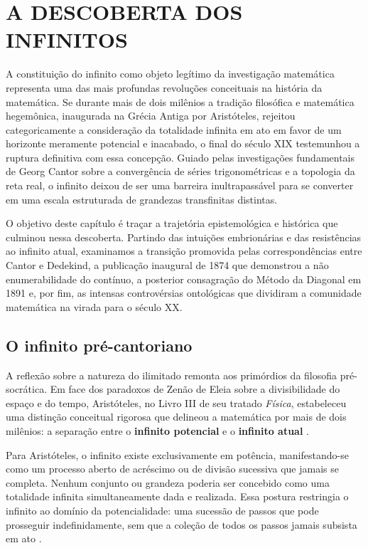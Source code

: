 
\chapter{A DESCOBERTA DOS INFINITOS}
\label{chap:infinitos}

A constituição do infinito como objeto legítimo da investigação matemática representa uma das mais profundas revoluções conceituais na história da matemática. Se durante mais de dois milênios a tradição filosófica e matemática hegemônica, inaugurada na Grécia Antiga por Aristóteles, rejeitou categoricamente a consideração da totalidade infinita em ato em favor de um horizonte meramente potencial e inacabado, o final do século XIX testemunhou a ruptura definitiva com essa concepção. Guiado pelas investigações fundamentais de Georg Cantor sobre a convergência de séries trigonométricas e a topologia da reta real, o infinito deixou de ser uma barreira inultrapassável para se converter em uma escala estruturada de grandezas transfinitas distintas.

O objetivo deste capítulo é traçar a trajetória epistemológica e histórica que culminou nessa descoberta. Partindo das intuições embrionárias e das resistências ao infinito atual, examinamos a transição promovida pelas correspondências entre Cantor e Dedekind, a publicação inaugural de 1874 que demonstrou a não enumerabilidade do contínuo, a posterior consagração do Método da Diagonal em 1891 e, por fim, as intensas controvérsias ontológicas que dividiram a comunidade matemática na virada para o século XX.

\section{O infinito pré-cantoriano}
\label{sec:infinito_tradicao_historica}

A reflexão sobre a natureza do ilimitado remonta aos primórdios da filosofia pré-socrática. Em face dos paradoxos de Zenão de Eleia sobre a divisibilidade do espaço e do tempo, Aristóteles, no Livro III de seu tratado \emph{Física}, estabeleceu uma distinção conceitual rigorosa que delineou a matemática por mais de dois milênios: a separação entre o \textbf{infinito potencial} e o \textbf{infinito atual} \parencite[p.~54]{maor1991}.

Para Aristóteles, o infinito existe exclusivamente em potência, manifestando-se como um processo aberto de acréscimo ou de divisão sucessiva que jamais se completa. Nenhum conjunto ou grandeza poderia ser concebido como uma totalidade infinita simultaneamente dada e realizada. Essa postura restringia o infinito ao domínio da potencialidade: uma sucessão de passos que pode prosseguir indefinidamente, sem que a coleção de todos os passos jamais subsista em ato \parencite[p.~55]{maor1991}.

